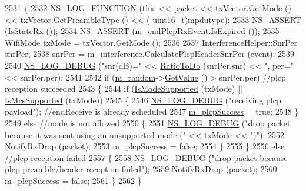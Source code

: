 \begin{DoxyCode}
2531 \{
2532   \hyperlink{log-macros-disabled_8h_a90b90d5bad1f39cb1b64923ea94c0761}{NS\_LOG\_FUNCTION} (\textcolor{keyword}{this} << packet << txVector.GetMode () << txVector.GetPreambleType () << (
      uint16\_t)mpdutype);
2533   \hyperlink{assert_8h_a6dccdb0de9b252f60088ce281c49d052}{NS\_ASSERT} (\hyperlink{classns3_1_1WifiPhy_a754ce070e2635c324a0b818b56eb0a4c}{IsStateRx} ());
2534   \hyperlink{assert_8h_a6dccdb0de9b252f60088ce281c49d052}{NS\_ASSERT} (\hyperlink{classns3_1_1WifiPhy_a82a8c191494752dc220bc3df57ea29cd}{m\_endPlcpRxEvent}.\hyperlink{classns3_1_1EventId_a5c30c92e7c1c34b4e8505cc07ed71b02}{IsExpired} ());
2535   WifiMode txMode = txVector.GetMode ();
2536 
2537   InterferenceHelper::SnrPer snrPer;
2538   snrPer = \hyperlink{classns3_1_1WifiPhy_a55909109ad2e2759702336770fa90119}{m\_interference}.\hyperlink{classns3_1_1InterferenceHelper_aba890dc2d1951f89e3bc0d33a9c649a3}{CalculatePlcpHeaderSnrPer} (event);
2539 
2540   \hyperlink{group__logging_ga413f1886406d49f59a6a0a89b77b4d0a}{NS\_LOG\_DEBUG} (\textcolor{stringliteral}{"snr(dB)="} << \hyperlink{namespacens3_a132cf27eedb5e15a1427faf8724be4d2}{RatioToDb} (snrPer.snr) << \textcolor{stringliteral}{", per="} << snrPer.per);
2541 
2542   \textcolor{keywordflow}{if} (\hyperlink{classns3_1_1WifiPhy_a0fd27ae928c74ebda56129b5b4248b90}{m\_random}->\hyperlink{classns3_1_1UniformRandomVariable_a03822d8c86ac51e9aa83bbc73041386b}{GetValue} () > snrPer.per) \textcolor{comment}{//plcp reception succeeded}
2543     \{
2544       \textcolor{keywordflow}{if} (\hyperlink{classns3_1_1WifiPhy_aed92380ac38a299687f08ab142f5bba3}{IsModeSupported} (txMode) || \hyperlink{classns3_1_1WifiPhy_a98ebea3fc93dd29a55303b166c271ef5}{IsMcsSupported} (txMode))
2545         \{
2546           \hyperlink{group__logging_ga413f1886406d49f59a6a0a89b77b4d0a}{NS\_LOG\_DEBUG} (\textcolor{stringliteral}{"receiving plcp payload"}); \textcolor{comment}{//endReceive is already scheduled}
2547           \hyperlink{classns3_1_1WifiPhy_ad9a571bc52ef6cd8e63cff3dc14a718e}{m\_plcpSuccess} = \textcolor{keyword}{true};
2548         \}
2549       \textcolor{keywordflow}{else} \textcolor{comment}{//mode is not allowed}
2550         \{
2551           \hyperlink{group__logging_ga413f1886406d49f59a6a0a89b77b4d0a}{NS\_LOG\_DEBUG} (\textcolor{stringliteral}{"drop packet because it was sent using an unsupported mode ("} << txMode
       << \textcolor{stringliteral}{")"});
2552           \hyperlink{classns3_1_1WifiPhy_a72138f22fada63f61f2026b86aa5abd2}{NotifyRxDrop} (packet);
2553           \hyperlink{classns3_1_1WifiPhy_ad9a571bc52ef6cd8e63cff3dc14a718e}{m\_plcpSuccess} = \textcolor{keyword}{false};
2554         \}
2555     \}
2556   \textcolor{keywordflow}{else} \textcolor{comment}{//plcp reception failed}
2557     \{
2558       \hyperlink{group__logging_ga413f1886406d49f59a6a0a89b77b4d0a}{NS\_LOG\_DEBUG} (\textcolor{stringliteral}{"drop packet because plcp preamble/header reception failed"});
2559       \hyperlink{classns3_1_1WifiPhy_a72138f22fada63f61f2026b86aa5abd2}{NotifyRxDrop} (packet);
2560       \hyperlink{classns3_1_1WifiPhy_ad9a571bc52ef6cd8e63cff3dc14a718e}{m\_plcpSuccess} = \textcolor{keyword}{false};
2561     \}
2562 \}
\end{DoxyCode}


